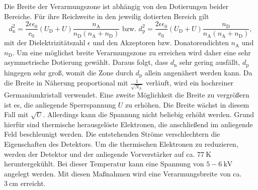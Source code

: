 Die Breite der Verarmungszone ist abhängig von den Dotierungen beider Bereiche. Für ihre Reichweite in den jeweilig dotierten Bereich gilt
\begin{equation}
    d_\text{n}^2 = \frac{2 \epsilon \epsilon_0}{\text{e}_0} (U_\text{D} + U) \frac{n_\text{A}}{n_\text{D}(n_\text{A}+n_\text{D})} \text{ bzw. } d_\text{p}^2 = \frac{2\epsilon \epsilon _0}{\text{e}_0} (U_\text{D} + U) \frac{n_\text{D}}{n_\text{A}(n_\text{A}+n_\text{D})} , \label{eq:d}
\end{equation}
mit der Dielektrizitätszahl $\epsilon$ und den Akzeptoren bzw. Donatorendichten $n_\text{A}$ und $n_\text{D}$.
 Um eine möglichst breite Verarmungszone zu erreichen wird daher eine sehr asymmetrische Dotierung gewählt. Daraus folgt, dass $d_\text{n}$ sehr gering ausfällt, $d_\text{p}$ hingegen sehr groß, womit die Zone durch $d_\text{p}$ allein angenähert werden kann. Da die Breite in Näherung proportional mit $\frac{1}{\sqrt{N_\text{A}}}$ verläuft, wird ein hochreiner Germaniumkristall verwendet. Eine zweite Möglichkeit die Breite zu vergrößern ist es, die anliegende Sperrspannung $U$ zu erhöhen. Die Breite wächst in diesem Fall mit $\sqrt{U}$. Allerdings kann die Spannung nicht beliebig erhöht werden. Grund hierfür sind thermische herausgelöste Elektronen, die anschließend im anliegende Feld beschleunigt werden. Die entstehenden Ströme verschlechtern die Eigenschaften des Detektors. Um die thermischen Elektronen zu reduzieren, werden der Detektor und der anliegende Vorverstärker auf ca. $\SI{77}{\kelvin}$ heruntergekühlt. Bei dieser Temperatur kann eine Spannung von $5-\SI{6}{\kilo\volt}$ angelegt werden. Mit diesen Maßnahmen wird eine Verarmungsbreite von ca. $\SI{3}{\centi\meter}$ erreicht.
 
 
